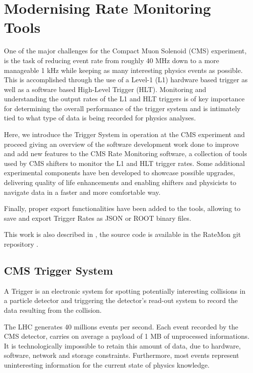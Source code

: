 \chapter{Modernising Rate Monitoring Tools}

One of the major challenges for the Compact Muon Solenoid (CMS) experiment, is the task of reducing event rate from roughly 40 MHz down to a more manageable 1 kHz while keeping as many interesting physics events as possible. This is accomplished through the use of a Level-1 (L1) hardware based trigger as well as a software based High-Level Trigger (HLT). Monitoring and understanding the output rates of the L1 and HLT triggers is of key importance for determining the overall performance of the trigger system and is intimately tied to what type of data is being recorded for physics analyses.

Here, we introduce the Trigger System in operation at the CMS experiment and proceed giving an overview of the software development work done to improve and add new features to the CMS Rate Monitoring software, a collection of tools used by CMS shifters to monitor the L1 and HLT trigger rates. Some additional experimental components have ben developed to showcase possible upgrades, delivering quality of life enhancements and enabling shifters and physicists to navigate data in a faster and more comfortable way.

Finally, proper export functionalities have been added to the tools, allowing to save and export Trigger Rates as JSON or ROOT binary files.

This work is also described in \cite{VivaceRTM1} \cite{VivaceRTM2} \cite{L1TriggerOMSDevelopments} \cite{MohrmanRTM}, the source code is available in the RateMon git repository \cite{RateMonGit}.

\section{CMS Trigger System}

A Trigger is an  electronic system for spotting potentially interesting collisions in a particle detector and triggering the detector’s read-out system to record the data resulting from the collision.

The LHC generates 40 millions events per second. Each event recorded by the CMS detector, carries on average a payload of 1 MB of unprocessed informations. It is technologically impossible to retain this amount of data, due to hardware, software, network and storage constraints. Furthermore, most events represent uninteresting information for the current state of physics knowledge.

